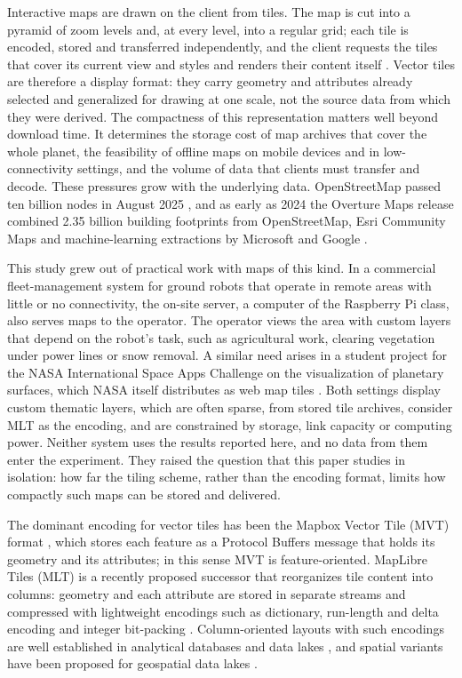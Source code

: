 Interactive maps are drawn on the client from tiles. The map is cut into a pyramid of
zoom levels and, at every level, into a regular grid; each tile is encoded, stored and
transferred independently, and the client requests the tiles that cover its current view
and styles and renders their content itself \citep{osm_slippy_tiles, ogc2022tms}.
Vector tiles are therefore a display format: they carry geometry and attributes already
selected and generalized for drawing at one scale, not the source data from which they
were derived. The compactness of this representation matters well beyond download time.
It determines the storage cost of map archives that cover the whole planet,
the feasibility of offline maps on mobile devices and in low-connectivity settings,
and the volume of data that clients must transfer and decode.
These pressures grow with the underlying data. OpenStreetMap passed ten billion
nodes in August 2025 \citep{osm_wiki_stats}, and as early as 2024 the Overture Maps
release combined 2.35 billion building footprints from OpenStreetMap, Esri Community
Maps and machine-learning extractions by Microsoft and Google \citep{overture2024alpha}.

This study grew out of practical work with maps of this kind. In a commercial
fleet-management system for ground robots that operate in remote areas with little or no
connectivity, the on-site server, a computer of the Raspberry Pi class, also serves maps
to the operator. The operator views the area with custom layers that depend on the
robot's task, such as agricultural work, clearing vegetation under power lines or snow
removal. A similar need arises in a student project for the NASA International Space
Apps Challenge \citep{space_apps} on the visualization of planetary surfaces, which NASA
itself distributes as web map tiles \citep{nasa_mars_trek_wmts}. Both settings display
custom thematic layers, which are often sparse, from stored tile archives, consider MLT as
the encoding, and are constrained by storage, link capacity or computing power. Neither
system uses the results reported here, and no data from them enter the experiment. They
raised the question that this paper studies in isolation: how far the tiling scheme,
rather than the encoding format, limits how compactly such maps can be stored and
delivered.

The dominant encoding for vector tiles has been the Mapbox Vector Tile (MVT) format
\citep{mapbox_mvt_spec_2_1}, which stores each feature as a Protocol Buffers message
that holds its geometry and its attributes; in this sense MVT is feature-oriented.
MapLibre Tiles (MLT) is a recently proposed successor that reorganizes tile content
into columns: geometry and each attribute are stored in separate streams and compressed
with lightweight encodings such as dictionary, run-length and delta encoding and
integer bit-packing \citep{tremmel2025mlt, maplibre_mlt_v1}.
Column-oriented layouts with such encodings are well established in analytical
databases and data lakes \citep{abadi2006compression, zeng2023columnar, kuschewski2023btrblocks},
and spatial variants have been proposed for geospatial data lakes \citep{saeedan2022spatialparquet}.

